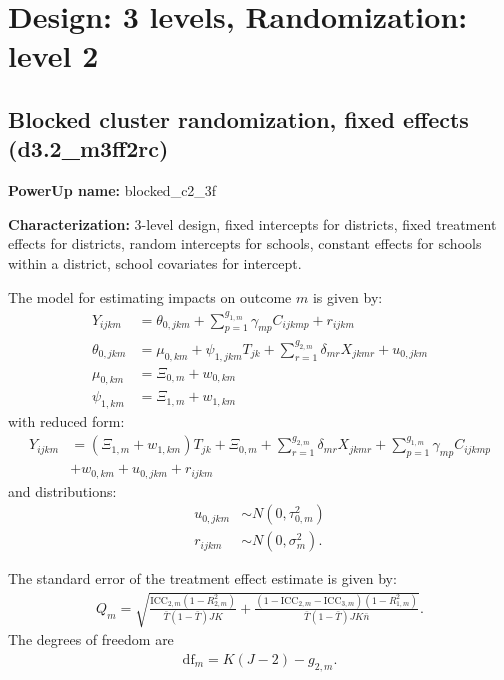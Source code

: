 \documentclass[12pt]{article}
\begin{document}
\section{Design: 3 levels, Randomization: level 2}


\subsection{Blocked cluster randomization, fixed effects (d3.2\_m3ff2rc)}

\textbf{PowerUp name:} blocked\_c2\_3f

\textbf{Characterization:} 3-level design, fixed intercepts for districts, fixed treatment effects for districts, random intercepts for schools, constant effects for schools within a district, school covariates for intercept.

The model for estimating impacts on outcome $m$ is given by:
\begin{align}
Y_{ijkm} &=  \theta_{0,jkm} + \sum_{p=1}^{g_{1,m}} \gamma_{mp} C_{ijkmp} + r_{ijkm}\\
\nonumber \theta_{0,jkm} &= \mu_{0,km} + \psi_{1,jkm} T_{jk} + \sum_{r=1}^{g_{2,m}} \delta_{mr} X_{jkmr} + u_{0,jkm}\\
\nonumber \mu_{0,km}  &= \Xi_{0,m}  + w_{0,km}\\
\nonumber \psi_{1,km} &= \Xi_{1,m} + w_{1,km}
\end{align}
with reduced form:
\begin{align}
Y_{ijkm} &= \left(\Xi_{1,m} + w_{1,km} \right) T_{jk} + \Xi_{0,m} + \sum_{r=1}^{g_{2,m}} \delta_{mr} X_{jkmr} + \sum_{p=1}^{g_{1,m}} \gamma_{mp} C_{ijkmp}\\
\nonumber &+ w_{0,km} + u_{0,jkm} + r_{ijkm}
\end{align}
and distributions:
\begin{align}
u_{0,jkm} &\sim N\left(0, \tau^2_{0,m}\right)\\
\nonumber r_{ijkm} &\sim N\left(0, \sigma^2_m\right).
\end{align}

The standard error of the treatment effect estimate is given by:
\begin{align}
Q_m = \sqrt{
\frac{\text{ICC}_{2,m}(1 - R^2_{2,m})}{\bar{T}(1 - \bar{T}) JK} +
\frac{(1-\text{ICC}_{2,m} - \text{ICC}_{3,m})(1-R^2_{1,m})}{\bar{T}(1 - \bar{T}) J K\bar{n}} }.\end{align}
The degrees of freedom are
\begin{align}\text{df}_m = K( J - 2) - g_{2,m}.\end{align}
\end{document}
